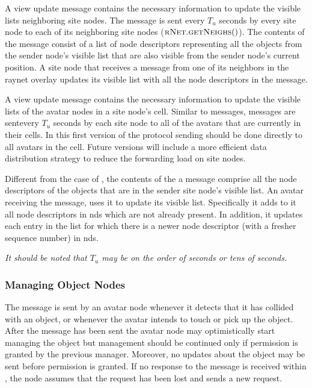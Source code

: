 \msgentry{\vupd}
\desc

A view update message contains the necessary information to update the
visible lists neighboring site nodes. The message is sent every $T_u$
seconds by every site node to each of its neighboring site nodes
($\textsc{rNet}.\textsc{getNeighs}()$). The contents of the message consist of a list of node
descriptors representing all the objects from the sender node's
visible list that are also visible from the sender node's current
position. A site node that receives a \vupd message from one of its
neighbors in the raynet overlay updates its visible list with all the
node descriptors in the message.

\msgentry{\snhb}
\desc

A view update message contains the necessary information to update the
visible lists of the avatar nodes in a site node's cell. Similar to
\vupd messages, \snhb messages are sentevery $T_u$ seconds by each
site node to all of the avatars that are currently in their cells. In
this first version of the protocol sending should be done directly to
all avatars in the cell. Future versions will include a more efficient
data distribution strategy to reduce the forwarding load on site
nodes.  

Different from the case of \vupd, the contents of the a \snhb
message comprise all the node descriptors of the objects that are in
the sender site node's visible list. An avatar receiving the message,
uses it to update its visible list.  Specifically it adds to it all
node descriptors in nds which are not already present. In addition, it
updates each entry in the list for which there is a newer node
descriptor (with a fresher sequence number) in nds.

\emph{It should be noted that $T_{u}$ may be on the order of seconds
  or tens of seconds.}


\subsubsection{Managing Object Nodes}


\msgentry{\oreq}
\desc

The message is sent by an avatar node whenever it detects that it has
collided with an object, or whenever the avatar intends to touch or
pick up the object. After the message has been sent the avatar node
may optimistically start managing the object but management should be
continued only if permission is granted by the previous
manager. Moreover, no updates about the object may be sent before
permission is granted. If no response to the message is received
within \acqT, the node assumes that the request has been lost and
sends a new request. 

